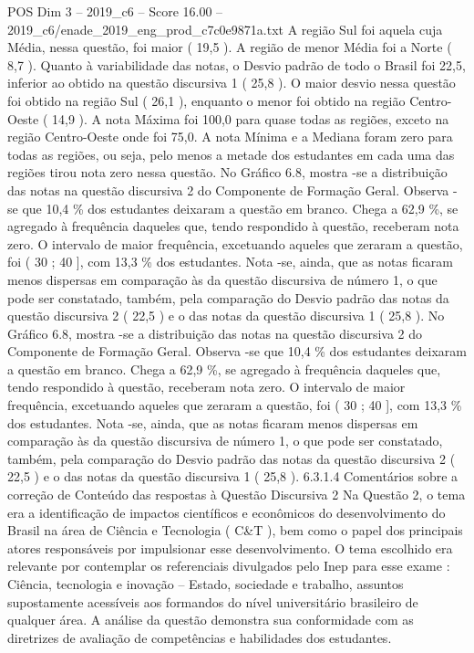 \begin{textsample}{POS Dim 3 – 2019\_c6 – Score 16.00 – 2019\_c6/enade\_2019\_eng\_prod\_c7c0e9871a.txt}
A região Sul foi aquela cuja Média, nessa questão, foi maior ( 19,5 ).
A região de menor Média foi a Norte ( 8,7 ).
Quanto à variabilidade das notas, o Desvio padrão de todo o Brasil foi 22,5, inferior ao obtido na questão discursiva 1 ( 25,8 ).
O maior desvio nessa questão foi obtido na região Sul ( 26,1 ), enquanto o menor foi obtido na região Centro-Oeste ( 14,9 ).
A nota Máxima foi 100,0 para quase todas as regiões, exceto na região Centro-Oeste onde foi 75,0.
A nota Mínima e a Mediana foram zero para todas as regiões, ou seja, pelo menos a metade dos estudantes em cada uma das regiões tirou nota zero nessa questão.
No Gráfico 6.8, mostra -se a distribuição das notas na questão discursiva 2 do Componente de Formação Geral.
Observa -se que 10,4 \% dos estudantes deixaram a questão em branco.
Chega a 62,9 \%, se agregado à frequência daqueles que, tendo respondido à questão, receberam nota zero.
O intervalo de maior frequência, excetuando aqueles que zeraram a questão, foi ( 30 ; 40 ], com 13,3 \% dos estudantes.
Nota -se, ainda, que as notas ficaram menos dispersas em comparação às da questão discursiva de número 1, o que pode ser constatado, também, pela comparação do Desvio padrão das notas da questão discursiva 2 ( 22,5 ) e o das notas da questão discursiva 1 ( 25,8 ).
No Gráfico 6.8, mostra -se a distribuição das notas na questão discursiva 2 do Componente de Formação Geral.
Observa -se que 10,4 \% dos estudantes deixaram a questão em branco.
Chega a 62,9 \%, se agregado à frequência daqueles que, tendo respondido à questão, receberam nota zero.
O intervalo de maior frequência, excetuando aqueles que zeraram a questão, foi ( 30 ; 40 ], com 13,3 \% dos estudantes.
Nota -se, ainda, que as notas ficaram menos dispersas em comparação às da questão discursiva de número 1, o que pode ser constatado, também, pela comparação do Desvio padrão das notas da questão discursiva 2 ( 22,5 ) e o das notas da questão discursiva 1 ( 25,8 ). 6.3.1.4 Comentários sobre a correção de Conteúdo das respostas à Questão Discursiva 2 Na Questão 2, o tema era a identificação de impactos científicos e econômicos do desenvolvimento do Brasil na área de Ciência e Tecnologia ( C\&T ), bem como o papel dos principais atores responsáveis por impulsionar esse desenvolvimento.
O tema escolhido era relevante por contemplar os referenciais divulgados pelo Inep para esse exame : Ciência, tecnologia e inovação – Estado, sociedade e trabalho, assuntos supostamente acessíveis aos formandos do nível universitário brasileiro de qualquer área.
A análise da questão demonstra sua conformidade com as diretrizes de avaliação de competências e habilidades dos estudantes.

\end{textsample}
